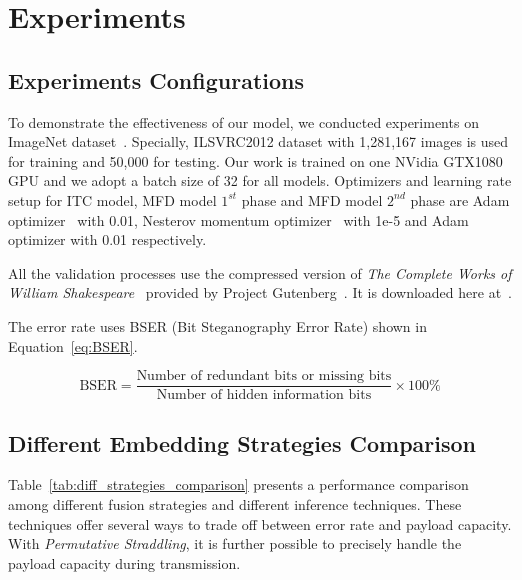 \section{Experiments}

\subsection{Experiments Configurations}

To demonstrate the effectiveness of our model, we conducted experiments on ImageNet dataset~\cite{ImageNet}. Specially, ILSVRC2012 dataset with 1,281,167 images is used for training and 50,000 for testing. Our work is trained on one NVidia GTX1080 GPU and we adopt a batch size of 32 for all models. Optimizers and learning rate setup for ITC model, MFD model \(1^{st}\) phase and MFD model \(2^{nd}\) phase are Adam optimizer~\cite{Adam} with 0.01, Nesterov momentum optimizer~\cite{Nesterov} with 1e-5 and Adam optimizer with 0.01 respectively.

All the validation processes use the compressed version of \textit{The Complete Works of William Shakespeare}~\cite{Shakespeare} provided by Project Gutenberg~\cite{Gutenberg}. It is downloaded here at~\cite{GutenbergShakespeare}.

The error rate uses BSER (Bit Steganography Error Rate) shown in Equation~\ref{eq:BSER}.

\begin{equation}
  \text{BSER} = \frac{\text{Number of redundant bits or missing bits}}{\text{Number of hidden information bits}} \times 100\%
  \label{eq:BSER}
\end{equation}

\subsection{Different Embedding Strategies Comparison}

Table~\ref{tab:diff_strategies_comparison} presents a performance comparison among different fusion strategies and different inference techniques. These techniques offer several ways to trade off between error rate and payload capacity. With \textit{Permutative Straddling}, it is further possible to precisely handle the payload capacity during transmission.

